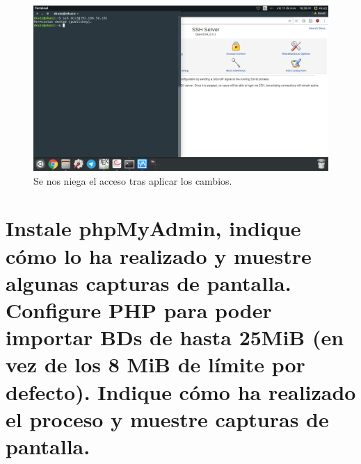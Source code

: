 \begin{flushleft}
\begin{figure}[H]
	\centering
	\includegraphics[scale=0.3]{webmin4.png}
	\caption{Se nos niega el acceso tras aplicar los cambios.}
\end{figure}


\section{Instale phpMyAdmin, indique cómo lo ha realizado y muestre algunas capturas de pantalla. Configure PHP para poder importar BDs de hasta 25MiB (en vez de los 8 MiB de límite por defecto). Indique cómo ha realizado el proceso y muestre capturas de pantalla.}

\end{flushleft}

